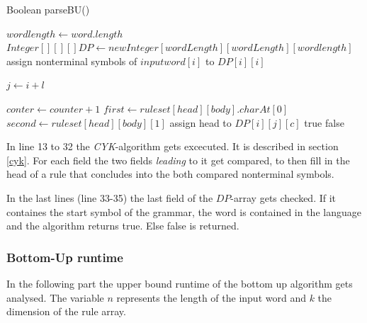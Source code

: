 \documentclass[a4paper, 11pt]{article}
\begin{document}
\begin{algorithm}[H]
\caption{Boolean parseBU()}\label{alg:cap}
\begin{algorithmic}[1]
\State $wordlength \gets word.length$ 
\State $Integer[][][] DP \gets new Integer[wordLength][wordLength][wordlength]$
\State assign nonterminal symbols of $inputword[i]$ to $DP[i][i]$
\EndIf
\EndFor

\State $j \gets i + l$

\State $conter \gets counter + 1$
\State $first \gets ruleset[head][body].charAt[0]$
\State $second \gets ruleset[head][body][1]$
\State assign head to $DP[i][j][c]$\footnotemark
\EndIf
\EndIf
\EndFor
\EndFor
\EndFor
\EndFor
\EndFor
{}
\State \Return true
\EndIf
\State \Return false
\end{algorithmic}
\end{algorithm}

In line 13 to 32 the \textit{CYK}-algorithm gets excecuted. It is described in section \ref{cyk}. For each field the two fields \textit{leading} to it get compared, to then fill in the head of a rule that concludes into the both compared nonterminal symbols.


In the last lines (line 33-35) the last field of the $DP$-array gets checked. If it containes the start symbol of the grammar, the word is contained in the language and the algorithm returns true. Else false is returned.




\subsubsection{Bottom-Up runtime}
\label{bottomupruntime}

In the following part the upper bound runtime of the bottom up algorithm gets analysed.
The variable $n$ represents the length of the input word and $k$ the dimension of the rule array. \\
\end{document}
